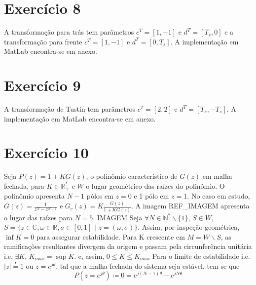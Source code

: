 \documentclass{article}
\begin{document}
\section*{Exercício 8}
A transformação para trás tem parâmetros $c^T = [1, -1]$ e $d^T = [T_s, 0]$ e a transformação para frente $c^T = [1, -1]$ e $d^T = [0, T_s]$. A implementação em MatLab encontra-se em anexo.
\section*{Exercício 9}
\label{ex:ex9}
A transformação de Tustin tem parâmetros $c^T = [2, 2]$ e $d^T = [T_s, -T_s]$. A implementação em MatLab encontra-se em anexo.
\section*{Exercício 10}
Seja $P(z) = 1 + K G(z)$, o polinômio característico de $G(z)$ em malha fechada, para $K \in \mathbb{R}^*_{+}$ e $W$ o lugar geométrico das raízes do polinômio. O polinômio apresenta $N-1$ pólos em $z = 0$ e 1 pólo em $z = 1$. No caso em estudo, $G(z) = \frac{1}{z^{N} - z^{N-1}}$ e $G_c(z) = K \frac{G(z)}{1 + K G(z)}$. A imagem REF\_IMAGEM apresenta o lugar das raízes para $N = 5$. 
IMAGEM
Seja $\forall N \in \mathbb{N}^*\backslash{\{1\}}$, $S \in W$, $S = \{z \in \mathbb{C}, \omega \in \mathbb{R}, \sigma \in [0, 1] \,\, | \,\, z = (\omega, \sigma)\}$. Assim, por inspeção geométrica, $\inf K = 0$ para assegurar estabilidade. Para K crescente em $M = W \backslash {S}$, as ramificações resultantes divergem da origem e passam pela circunferência unitária i.e. $\exists K$, $K_{max} = \sup K$. e, assim, $0 \leq K \leq K_{max}$
Para o limite de estabilidade i.e. $|z| \stackrel{!}{=} 1$ ou $z = e^{j \theta}$, tal que a malha fechada do sistema seja estável, tem-se que
\begin{equation}
P(z = e^{j \theta}) \coloneqq 0 = e^{j (N-1) \theta} - e^{j N \theta}
\label{eq:Pz}
\end{equation}
\end{document}
